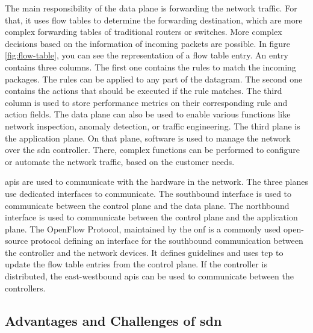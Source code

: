 \documentclass[conference]{IEEEtran}
\begin{document}
    The main responsibility of the data plane is forwarding the network traffic. For that, it uses flow tables to determine the forwarding destination, which are more complex forwarding tables of traditional routers or switches. More complex decisions based on the information of incoming packets are possible. In figure \ref{fig:flow-table}, you can see the representation of a flow table entry. An entry contains three columns. The first one contains the rules to match the incoming packages. The rules can be applied to any part of the datagram. The second one contains the actions that should be executed if the rule matches. The third column is used to store performance metrics on their corresponding rule and action fields. \cite{sdn-overview} The data plane can also be used to enable various functions like network inspection, anomaly detection, or traffic engineering. \cite{MASOUDI20161} The third plane is the application plane. On that plane, software is used to manage the network over the \ac{sdn} controller. There, complex functions can be performed to configure or automate the network traffic, based on the customer needs. 
	
	\acp{api} are used to communicate with the hardware in the network.	The three planes use dedicated interfaces to communicate. The southbound interface is used to communicate between the control plane and the data plane. The northbound interface is used to communicate between the control plane and the application plane. The OpenFlow Protocol, maintained by the \ac{onf} is a commonly used open-source protocol defining an interface for the southbound communication between the controller and the network devices. It defines guidelines and uses \ac{tcp} to update the flow table entries from the control plane. If the controller is distributed, the east-westbound \acp{api} can be used to communicate between the controllers. \cite{sdn-overview}


	\subsection{Advantages and Challenges of \ac{sdn}}
\end{document}
